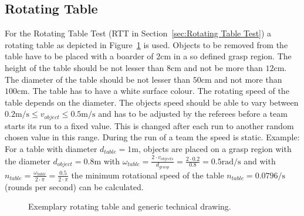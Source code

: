 \subsection{Rotating Table}\label{sec:Rotating Table}
For the Rotating Table Test (RTT in Section~\ref{sec:Rotating Table Test}) a rotating table as depicted in Figure~\ref{fig:rottable} is used. 
Objects to be removed from the table have to be placed with a boarder of $2\si{\centi\meter}$ in a so defined grasp region. The height of the table should be not lesser than $8\si{\centi\meter}$ and not be more than $12\si{\centi\meter}$. The diameter of the table should be not lesser than $50\si{\centi\meter}$ and not more than $100\si{\centi\meter}$. The table has to have a white surface colour. The rotating speed of the table depends on the diameter. The objects speed should be able to vary between $0.2 \si{\meter\per\second} \le v_{object} \le 0.5 \si{\meter\per\second}$ and has to be adjusted by the referees before a team starts its run to a fixed value. This is changed after each run to another random chosen value in this range. During the run of a team the speed is static. Example: For a table with diameter $d_{table}=1\si{\meter}$, objects are placed on a grasp region with the diameter $d_{object}=0.8\si{\meter}$ with $\omega_{table} = \frac{2 \cdot v_{objects} }{d_{grasp}}=\frac{2 \cdot 0.2}{0.8}=0.5\si{\radian\per\second}$ and with $n_{table}=\frac{\omega_{table}}{2 \cdot \pi}=\frac{0.5}{2 \cdot \pi}$ the minimum rotational speed of the table $n_{table}= 0.0796 \si{\per\second}$ (rounds per second) can be calculated.  

\begin{figure}[h!]
	\centering
	\caption{Exemplary rotating table and generic technical drawing.}%
	\label{fig:rottable}
\end{figure}


